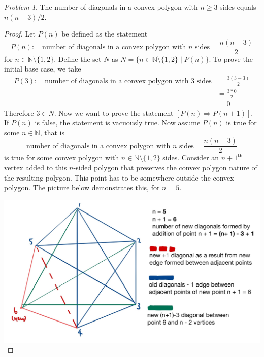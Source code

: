 \documentclass[11pt,twoside, reqno, align]{amsart}
\theoremstyle{remark}
\newtheorem{Prob}{Problem}
\def\N{\mathbb N}
\renewcommand{\implies}{\Rightarrow}
\begin{document}
\begin{Prob}
The number of diagonals in a convex polygon with $n \geq 3$ sides equals $n(n-3)/2$.
\end{Prob}

\begin{proof}
Let $P(n)$ be defined as the statement
$$
P(n): \quad \text{number of diagonals in a convex polygon with $n$ sides} = \frac{n(n-3)}{2}
$$
for $n \in \N \setminus \{1,2\}$. Define the set $N$ as $N = \{ n \in \N \setminus \{1,2\} \mid P(n)\}$. To prove the initial base case, we take
\begin{align*}
    P(3): \quad \text{number of diagonals in a convex polygon with $3$ sides} & = \frac{3(3-3)}{2} \\
    & = \frac{3*0}{2} \\
    & = 0
\end{align*} 
Therefore $3 \in N$. Now we want to prove the statement $[P(n) \implies P(n+1)]$. If $P(n)$ is false, the statement is vacuously true. Now assume $P(n)$ is true for some $n \in \N$, that is
$$
\text{number of diagonals in a convex polygon with $n$ sides} = \frac{n(n-3)}{2}
$$
is true for some convex polygon with $n \in \N \setminus \{1,2\}$ sides. Consider an ${n+1}^{\text{th}}$ vertex added to this $n$-sided polygon that preserves the convex polygon nature of the resulting polygon. This point has to be somewhere outside the convex polygon. The picture below demonstrates this, for $n = 5$.

\includegraphics[scale=0.20]{math0450q2picproof.jpg}


\end{proof}
\end{document}
